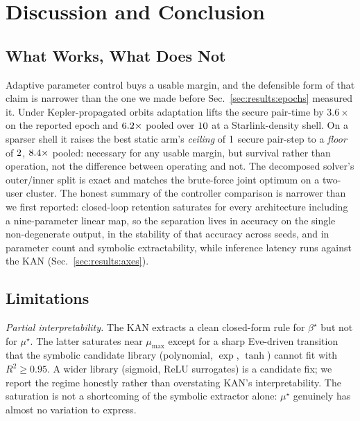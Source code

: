 \section{Discussion and Conclusion}\label{sec:conclusion}

\subsection{What Works, What Does Not}\label{sec:conclusion:summary}

Adaptive parameter control buys a usable margin, and the defensible form of that claim is narrower than the one we made before Sec.~\ref{sec:results:epochs} measured it. Under Kepler-propagated orbits adaptation lifts the secure pair-time by $3.6\times$ on the reported epoch and $6.2\times$ pooled over $10$ at a Starlink-density shell. On a sparser shell it raises the best static arm's \emph{ceiling} of $1$ secure pair-step to a \emph{floor} of $2$, $8.4\times$ pooled: necessary for any usable margin, but survival rather than operation, not the difference between operating and not. The decomposed solver's outer/inner split is exact and matches the brute-force joint optimum on a two-user cluster. The honest summary of the controller comparison is narrower than we first reported: closed-loop retention saturates for every architecture including a nine-parameter linear map, so the separation lives in accuracy on the single non-degenerate output, in the stability of that accuracy across seeds, and in parameter count and symbolic extractability, while inference latency runs against the KAN (Sec.~\ref{sec:results:axes}).

\subsection{Limitations}\label{sec:conclusion:limits}

\emph{Partial interpretability.} The KAN extracts a clean closed-form rule for $\beta^\star$ but not for $\mu^\star$. The latter saturates near $\mu_{\max}$ except for a sharp Eve-driven transition that the symbolic candidate library (polynomial, $\exp$, $\tanh$) cannot fit with $R^2 \ge 0.95$. A wider library (sigmoid, ReLU surrogates) is a candidate fix; we report the regime honestly rather than overstating KAN's interpretability. The saturation is not a shortcoming of the symbolic extractor alone: $\mu^\star$ genuinely has almost no variation to express.


